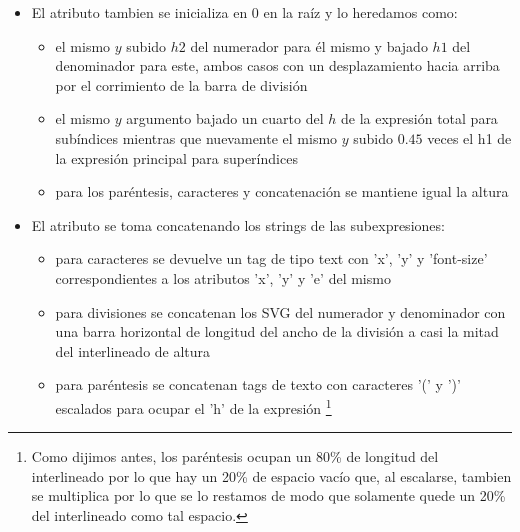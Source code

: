 \begin{itemize}
	\item El atributo \textbf{} tambien se inicializa en 0 en la raíz y lo heredamos como:
	\begin{itemize}
		\item el mismo $y$ subido $h2$ del numerador para él mismo y bajado $h1$ del denominador para este, ambos casos con un desplazamiento hacia arriba por el corrimiento de la barra de división
		\item el mismo $y$ argumento bajado un cuarto del $h$ de la expresión total para subíndices mientras que nuevamente el mismo $y$ subido $0.45$ veces el h1 de la expresión principal para superíndices
		\item para los paréntesis, caracteres y concatenación se mantiene igual la altura
	\end{itemize}

	\item El atributo \textbf{} se toma concatenando los strings de las subexpresiones:
	\begin{itemize}
		\item para caracteres se devuelve un tag de tipo text con 'x', 'y' y 'font-size' correspondientes a los atributos 'x', 'y' y 'e' del mismo
		\item para divisiones se concatenan los SVG del numerador y denominador con una barra horizontal de longitud del ancho de la división a casi la mitad del interlineado de altura
		\item para paréntesis se concatenan tags de texto con caracteres '(' y ')' escalados para ocupar el 'h' de la expresión \footnote{Como dijimos antes, los paréntesis ocupan un 80\% de longitud del interlineado por lo que hay un 20\% de espacio vacío que, al escalarse, tambien se multiplica por lo que se lo restamos de modo que solamente quede un 20\% del interlineado como tal espacio.}
	\end{itemize}
\end{itemize}
